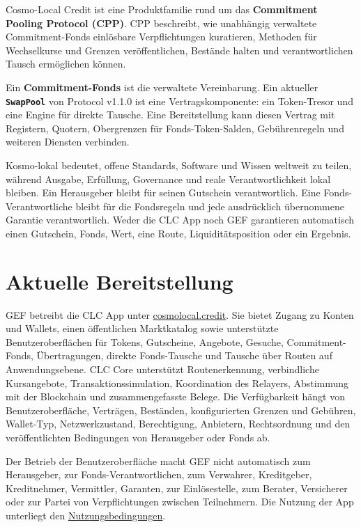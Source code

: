 \documentclass[11pt]{article}
\begin{document}
Cosmo-Local Credit ist eine Produktfamilie rund um das \textbf{Commitment Pooling Protocol (CPP)}. CPP beschreibt, wie unabhängig verwaltete Commitment-Fonds einlösbare Verpflichtungen kuratieren, Methoden für Wechselkurse und Grenzen veröffentlichen, Bestände halten und verantwortlichen Tausch ermöglichen können.

Ein \textbf{Commitment-Fonds} ist die verwaltete Vereinbarung. Ein aktueller \textbf{\texttt{SwapPool}} von Protocol v1.1.0 ist eine Vertragskomponente: ein Token-Tresor und eine Engine für direkte Tausche. Eine Bereitstellung kann diesen Vertrag mit Registern, Quotern, Obergrenzen für Fonds-Token-Salden, Gebührenregeln und weiteren Diensten verbinden.

Kosmo-lokal bedeutet, offene Standards, Software und Wissen weltweit zu teilen, während Ausgabe, Erfüllung, Governance und reale Verantwortlichkeit lokal bleiben. Ein Herausgeber bleibt für seinen Gutschein verantwortlich. Eine Fonds-Verantwortliche bleibt für die Fondsregeln und jede ausdrücklich übernommene Garantie verantwortlich. Weder die CLC App noch GEF garantieren automatisch einen Gutschein, Fonds, Wert, eine Route, Liquiditätsposition oder ein Ergebnis.

\section*{Aktuelle Bereitstellung}

GEF betreibt die CLC App unter \href{https://cosmolocal.credit}{cosmolocal.credit}. Sie bietet Zugang zu Konten und Wallets, einen öffentlichen Marktkatalog sowie unterstützte Benutzeroberflächen für Tokens, Gutscheine, Angebote, Gesuche, Commitment-Fonds, Übertragungen, direkte Fonds-Tausche und Tausche über Routen auf Anwendungsebene. CLC Core unterstützt Routenerkennung, verbindliche Kursangebote, Transaktionssimulation, Koordination des Relayers, Abstimmung mit der Blockchain und zusammengefasste Belege. Die Verfügbarkeit hängt von Benutzeroberfläche, Verträgen, Beständen, konfigurierten Grenzen und Gebühren, Wallet-Typ, Netzwerkzustand, Berechtigung, Anbietern, Rechtsordnung und den veröffentlichten Bedingungen von Herausgeber oder Fonds ab.

Der Betrieb der Benutzeroberfläche macht GEF nicht automatisch zum Herausgeber, zur Fonds-Verantwortlichen, zum Verwahrer, Kreditgeber, Kreditnehmer, Vermittler, Garanten, zur Einlösestelle, zum Berater, Versicherer oder zur Partei von Verpflichtungen zwischen Teilnehmern. Die Nutzung der App unterliegt den \href{https://docs.cosmolocal.credit/de/governance/terms}{Nutzungsbedingungen}.
\end{document}
